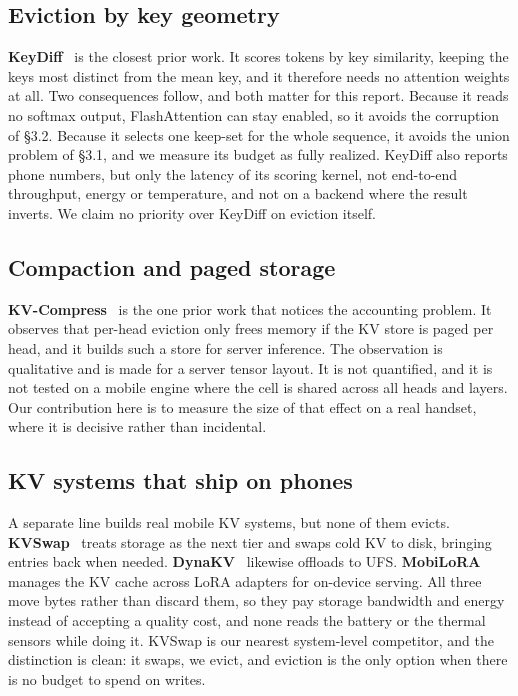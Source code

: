 \documentclass[11pt]{article}
\begin{document}
\subsection{Eviction by key geometry}
\textbf{KeyDiff}~\cite{keydiff} is the closest prior work. It scores tokens by key similarity,
keeping the keys most distinct from the mean key, and it therefore needs no attention weights
at all. Two consequences follow, and both matter for this report. Because it reads no softmax
output, FlashAttention can stay enabled, so it avoids the corruption of \S3.2. Because it
selects one keep-set for the whole sequence, it avoids the union problem of \S3.1, and we
measure its budget as fully realized. KeyDiff also reports phone numbers, but only the latency
of its scoring kernel, not end-to-end throughput, energy or temperature, and not on a backend
where the result inverts. We claim no priority over KeyDiff on eviction itself.

\subsection{Compaction and paged storage}
\textbf{KV-Compress}~\cite{kvcompress} is the one prior work that notices the accounting
problem. It observes that per-head eviction only frees memory if the KV store is paged per
head, and it builds such a store for server inference. The observation is qualitative and is
made for a server tensor layout. It is not quantified, and it is not tested on a mobile engine
where the cell is shared across all heads and layers. Our contribution here is to measure the
size of that effect on a real handset, where it is decisive rather than incidental.

\subsection{KV systems that ship on phones}
A separate line builds real mobile KV systems, but none of them evicts.
\textbf{KVSwap}~\cite{kvswap} treats storage as the next tier and swaps cold KV to disk,
bringing entries back when needed. \textbf{DynaKV}~\cite{dynakv} likewise offloads to UFS.
\textbf{MobiLoRA}~\cite{mobilora} manages the KV cache across LoRA adapters for on-device
serving. All three move bytes rather than discard them, so they pay storage bandwidth and
energy instead of accepting a quality cost, and none reads the battery or the thermal
sensors while doing it. KVSwap is our nearest system-level competitor, and the distinction is
clean: it swaps, we evict, and eviction is the only option when there is no budget to spend
on writes.
\end{document}
